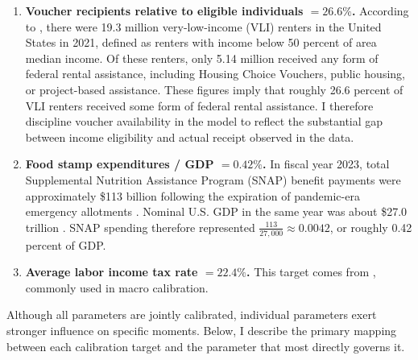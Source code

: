 \documentclass[parskip=full]{article}
\theoremstyle{plain}
\theoremstyle{definition}
\theoremstyle{remark}
\begin{document}
\begin{enumerate}
\item \textbf{Voucher recipients relative to eligible individuals $=26.6\%$.} According to \citet{hud_worstcase2023}, there were 19.3 million very-low-income (VLI) renters in the United States in 2021, defined as renters with income below 50 percent of area median income. Of these renters, only 5.14 million received any form of federal rental assistance, including Housing Choice Vouchers, public housing, or project-based assistance. These figures imply that roughly 26.6 percent of VLI renters received some form of federal rental assistance. I therefore discipline voucher availability in the model to reflect the substantial gap between income eligibility and actual receipt observed in the data.

\item \textbf{Food stamp expenditures / GDP $=0.42\%$.} In fiscal year 2023, total Supplemental Nutrition Assistance Program (SNAP) benefit payments were approximately \$113 billion following the expiration of pandemic-era emergency allotments \citep{usda_snap_2023}. Nominal U.S. GDP in the same year was about \$27.0 trillion \citep{bea_gdp_2023}. SNAP spending therefore represented $\frac{113}{27{,}000} \approx 0.0042$, or roughly 0.42 percent of GDP.

\item \textbf{Average labor income tax rate $=22.4\%$.} This target comes from \citet{mcdaniel-2007}, commonly used in macro calibration.

\end{enumerate}

Although all parameters are jointly calibrated, individual parameters exert stronger influence on specific moments. Below, I describe the primary mapping between each calibration target and the parameter that most directly governs it.
\end{document}
